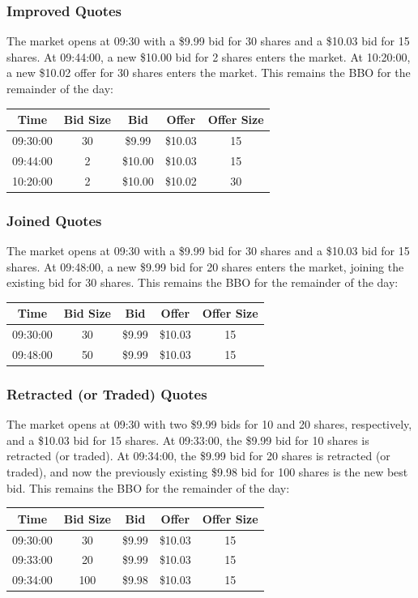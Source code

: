 \documentclass{article}
\begin{document}
\subsubsection{Improved Quotes}
The market opens at 09:30 with a \$9.99 bid for 30 shares and a \$10.03 bid for 15 shares. At 09:44:00, a new \$10.00 bid for 2 shares enters the market. At 10:20:00, a new \$10.02 offer for 30 shares enters the market. This remains the BBO for the remainder of the day:
\begin{center}
  \begin{tabular}{| c | c | c | c | c |}
    \hline
    Time & Bid Size & Bid & Offer & Offer Size \\ \hline
    09:30:00 & 30 & \$9.99 & \$10.03 & 15 \\ \hline
    09:44:00 & 2 & \$10.00 & \$10.03 & 15 \\ \hline
    10:20:00 & 2 & \$10.00 & \$10.02 & 30 \\
    \hline
  \end{tabular}
\end{center}
\subsubsection{Joined Quotes}
The market opens at 09:30 with a \$9.99 bid for 30 shares and a \$10.03 bid for 15 shares. At 09:48:00, a new \$9.99 bid for 20 shares enters the market, joining the existing bid for 30 shares. This remains the BBO for the remainder of the day:
\begin{center}
  \begin{tabular}{| c | c | c | c | c |}
    \hline
    Time & Bid Size & Bid & Offer & Offer Size \\ \hline
    09:30:00 & 30 & \$9.99 & \$10.03 & 15 \\ \hline
    09:48:00 & 50 & \$9.99 & \$10.03 & 15 \\ 
    \hline
  \end{tabular}
\end{center}
\subsubsection{Retracted (or Traded) Quotes}
The market opens at 09:30 with two \$9.99 bids for 10 and 20 shares, respectively, and a \$10.03 bid for 15 shares. At 09:33:00, the \$9.99 bid for 10 shares is retracted (or traded). At 09:34:00, the \$9.99 bid for 20 shares is retracted (or traded), and now the previously existing \$9.98 bid for 100 shares is the new best bid. This remains the BBO for the remainder of the day:
\begin{center}
  \begin{tabular}{| c | c | c | c | c |}
    \hline
    Time & Bid Size & Bid & Offer & Offer Size \\ \hline
    09:30:00 & 30 & \$9.99 & \$10.03 & 15 \\ \hline
    09:33:00 & 20 & \$9.99 & \$10.03 & 15 \\ \hline
    09:34:00 & 100 & \$9.98 & \$10.03 & 15 \\
    \hline
  \end{tabular}
\end{center}
\end{document}
